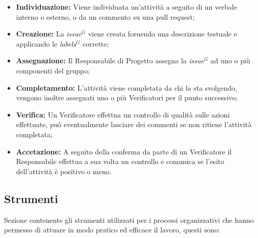         \begin{itemize}
            \item \textbf{Individuazione:} Viene individuata un'attività a seguito di un verbale interno o esterno, o da un commento su una pull request;
            \item \textbf{Creazione:} La \emph{issue}$^{G}$ viene creata fornendo una descrizione testuale e applicando le \emph{labels}$^{G}$ corrette;
            \item \textbf{Assegnazione:} Il Responsabile di Progetto assegna la \emph{issue}$^{G}$ ad uno o più componenti del gruppo;
            \item \textbf{Completamento:} L'attività viene completata da chi la sta svolgendo, vengono inoltre assegnati uno o più Verificatori per il punto successivo;
            \item \textbf{Verifica:} Un Verificatore effettua un controllo di qualità sulle azioni effettuate, può eventualmente lasciare dei commenti se non ritiene l'attività completata;
            \item \textbf{Accetazione:} A seguito della conferma da parte di un Verificatore il Responsabile effettua a sua volta un controllo e comunica se l'esito dell'attività è positivo o meno.
        \end{itemize}

        \subsection{Strumenti}

        Sezione contenente gli strumenti utilizzati per i processi organizzativi che hanno permesso di attuare in modo pratico ed efficace il lavoro, questi sono:

